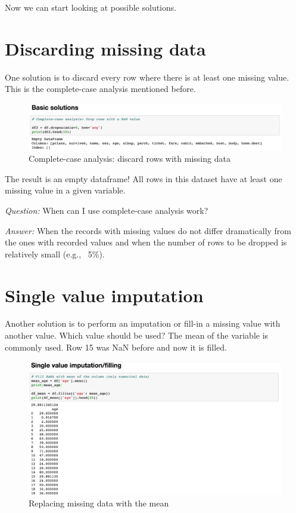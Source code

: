 \documentclass[a4paper]{article}
\begin{document}
\pagebreak\par\noindent Now we can start looking at possible solutions.

\section{Discarding missing data}

One solution is to discard every row where there is at least one missing value. This is the complete-case analysis mentioned before. 

\begin{figure}[htbp]
\centering
\includegraphics[width = \textwidth]{images/python4a.png}
\caption{Complete-case analysis: discard rows with missing data}
\end{figure}

\par\noindent The result is an empty dataframe! All rows in this dataset have at least one missing value in a given variable. 

\par\noindent \textit{Question: } When can I use complete-case analysis work?
\par\noindent \textit{Answer: }When the records with missing values do not differ dramatically from the ones with recorded values and when the number of rows to be dropped is relatively small (e.g., ~5\%).

\section*{Single value imputation}

Another solution is to perform an imputation or fill-in a missing value with another value. Which value should be used? The mean of the variable is commonly used. Row 15 was NaN before and now it is filled. 

\begin{figure}[htbp]
\centering
\includegraphics[width = \textwidth]{images/python4.png}
\caption{Replacing missing data with the mean}
\end{figure}
\end{document}
